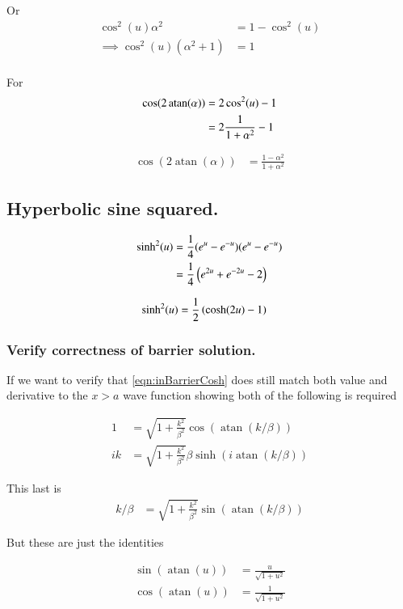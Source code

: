 \documentclass{article}
\DeclareMathOperator{\atan}{atan}
\begin{document}
Or
\begin{align*}
\cos^2(u) \alpha^2 &= 1 - \cos^2(u) \\
\implies
\cos^2(u) (\alpha^2 +1 ) &= 1 \\
\end{align*}

For 
\begin{align*}
\cos(2\atan(\alpha)) 
&= 
2 \cos^2( u ) -1 \\
&= 
2 \inv{1 + \alpha^2} -1 \\
\end{align*}

\begin{align}\label{eqn:cosineTwiceArcTan}
\cos(2\atan(\alpha)) 
&= 
\frac{1 - \alpha^2}{1 + \alpha^2}
\end{align}

\subsection{ Hyperbolic sine squared. }

\begin{align*}
\sinh^2(u) 
&=
\frac{1}{4} (e^u - e^{-u}) (e^u - e^{-u}) \\
&=
\frac{1}{4} \left(e^{2u} + e^{-2u} -2 \right) \\
\end{align*}

\begin{align}\label{eqn:sinhSquared}
\sinh^2(u) 
&=
\frac{1}{2} \left( \cosh(2u) -1 \right) 
\end{align}

\subsubsection{ Verify correctness of barrier solution. }

If we want to verify that \ref{eqn:inBarrierCosh} 
does still match both value and derivative to the $x>a$ wave function
showing both of the following is required

\begin{align*}
1 &= \sqrt{1 + \frac{k^2}{\beta^2}} \cos\left( \atan(k/\beta) \right) \\
ik &=
\sqrt{1 + \frac{k^2}{\beta^2}} \beta \sinh\left( i \atan(k/\beta) \right)
\end{align*}

This last is
\begin{align*}
k/\beta &=
\sqrt{1 + \frac{k^2}{\beta^2}} \sin\left( \atan(k/\beta) \right)
\end{align*}

But these are just the identities

\begin{align*}
\sin\left( \atan(u) \right) &= \frac{u}{\sqrt{1 + u^2}} \\
\cos\left( \atan(u) \right) &= \frac{1}{\sqrt{1 + u^2}}
\end{align*}



\end{document}
